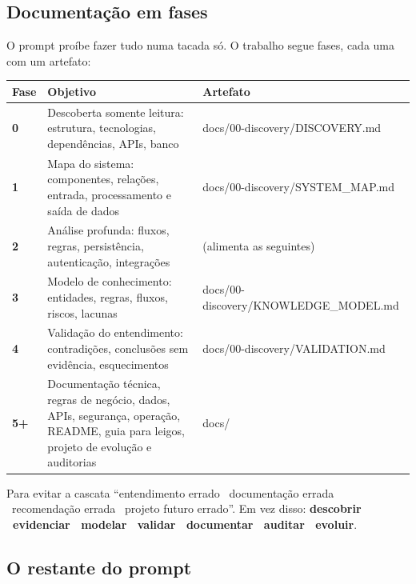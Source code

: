 \subsection{Documentação em fases}

O prompt proíbe fazer tudo numa tacada só. O trabalho segue fases, cada uma com um artefato:

\begin{center}
\renewcommand{\arraystretch}{1.3}
\small
\begin{tabularx}{\linewidth}{@{}>{\bfseries\color{azulMB}}l >{\raggedright\arraybackslash}X >{\ttfamily\footnotesize}l@{}}
\toprule
\textbf{Fase} & \textbf{Objetivo} & \textrm{\textbf{Artefato}} \\
\midrule
0 & Descoberta somente leitura: estrutura, tecnologias, dependências, APIs, banco & docs/00-discovery/DISCOVERY.md \\
1 & Mapa do sistema: componentes, relações, entrada, processamento e saída de dados & docs/00-discovery/SYSTEM\_MAP.md \\
2 & Análise profunda: fluxos, regras, persistência, autenticação, integrações & \textrm{(alimenta as seguintes)} \\
3 & Modelo de conhecimento: entidades, regras, fluxos, riscos, lacunas & docs/00-discovery/KNOWLEDGE\_MODEL.md \\
4 & Validação do entendimento: contradições, conclusões sem evidência, esquecimentos & docs/00-discovery/VALIDATION.md \\
5+ & Documentação técnica, regras de negócio, dados, APIs, segurança, operação, README, guia para leigos, projeto de evolução e auditorias & docs/ \\
\bottomrule
\end{tabularx}
\end{center}

\begin{conceito}
Para evitar a cascata \enquote{entendimento errado \faLongArrowAltRight\ documentação errada \faLongArrowAltRight\ recomendação errada \faLongArrowAltRight\ projeto futuro errado}. Em vez disso: \textbf{descobrir \faLongArrowAltRight\ evidenciar \faLongArrowAltRight\ modelar \faLongArrowAltRight\ validar \faLongArrowAltRight\ documentar \faLongArrowAltRight\ auditar \faLongArrowAltRight\ evoluir}.
\end{conceito}

\subsection{O restante do prompt}

